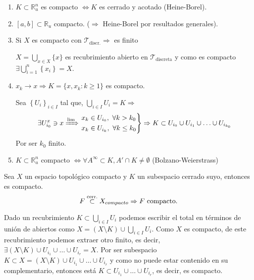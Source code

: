 \begin{ej}
\begin{enumerate}
    \item $K \subset \mathbb{R}_u^n$ es compacto $\Leftrightarrow K$ es cerrado y acotado (Heine-Borel). 
    \item $\left[ a, b \right] \subset \mathbb{R}_u$ compacto. ($\Rightarrow$ Heine-Borel por resultados generales).
    \item Si $X$ es compacto con $\mathcal{T}_{\text{discr.}} \Rightarrow$ es finito 
    \begin{demo}
        $X = \bigcup_{x \in X} \{x\}$ es recubrimiento abierto en $\mathcal{T}_{\text{discreta}}$ y como es compacto $\exists \bigcup_{i=1}^n \left\{ x_i \right\} = X$.
    \end{demo}
    \item $x_k \rightarrow x \Rightarrow K = \{x, x_k: k \ge 1\}$ es compacto.
    \begin{demo}
        Sea $\left\{ U_i \right\}_{i \in I}$ tal que, $\bigcup_{i \in I} U_i = K \Rightarrow$
        \[
            \exists U_{i_0}^x \ni x \xRightarrow{\lim} \begin{rcases}
                x_k \in U_{i_0},\ \forall k > k_0\\
                x_k \in U_{i_k},\ \forall k \le k_0
            \end{rcases} \Rightarrow K \subset U_{i_0} \cup U_{i_1} \cup \ldots \cup U_{i_{k_0}} 
        \]
        Por ser $k_0$ finito.
    \end{demo}

    \item $K \subset \mathbb{R}_u^n$ compacto $\Leftrightarrow \forall A^{\infty} \subset K, A' \cap K \neq \emptyset$ (Bolzano-Weierstrass)
\end{enumerate}
\end{ej}

\begin{prop}[Mantra 1]
Sea $X$ un espacio topológico compacto y $K$ un subespacio cerrado suyo, entonces es compacto.
\[
F \stackrel{\text{cerr.}}{\subset} X _{compacto} \Rightarrow F \text{ compacto.}
\]
\end{prop}
\begin{demo}
Dado un recubrimiento $K \subset \bigcup_{i \in I} U_i$ podemos escribir el total en términos de unión de abiertos como $X = \left( X \setminus K \right) \cup \bigcup_{i \in I} U_i$. Como $X$ es compacto, de este recubrimiento podemos extraer otro finito, es decir, $\exists \left( X \setminus K \right) \cup U_{i_1} \cup \ldots \cup U_{i_r} = X$. Por ser subespacio $K \subset X = \left( X \setminus K \right) \cup U_{i_1} \cup \ldots \cup U_{i_r}$ y como no puede estar contenido en su complementario, entonces está $K\subset U_{i_1} \cup \ldots \cup U_{i_r}$, es decir, es compacto.
\end{demo}

